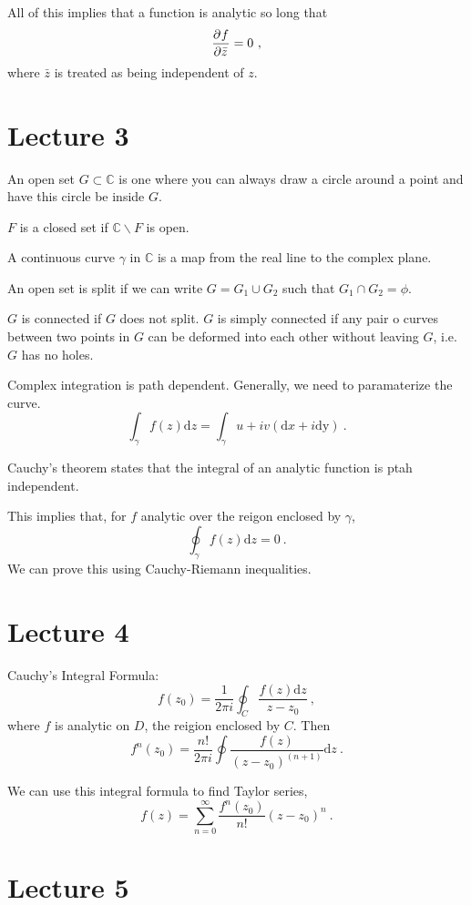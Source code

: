 \documentclass[11pt, a4paper]{article}
\begin{document}
All of this implies that a function is analytic so long that
$$
	\frac{\partial^{} {f}}{\partial {\bar{z}}^{}} = 0~,
$$
where $\bar{z}$ is treated as being independent of $z$.

\section{Lecture 3}

An open set $G\subset\mathbb{C}$ is one where you can always draw a circle around a point and have this circle be inside $G$.

$F$ is a closed set if $\mathbb{C}\backslash F$ is open.

A continuous curve $\gamma$ in $\mathbb{C}$ is a map from the real line to the complex plane.

An open set is split if we can write $G = G_1 \cup G_2$ such that $G_1 \cap G_2 = \phi$.

$G$ is connected if $G$ does not split.
$G$ is simply connected if any pair o curves between two points in $G$ can be deformed into each other without leaving $G$, i.e. $G$ has no holes.

Complex integration is path dependent. 
Generally, we need to paramaterize the curve.
$$
	\int_\gamma f(z)\mathrm{d}z = \int_\gamma u+iv(\mathrm{d}x + i\mathrm{dy})~.
$$

Cauchy's theorem states that the integral of an analytic function is ptah independent.

This implies that, for $f$ analytic over the reigon enclosed by $\gamma$,
$$
	\oint_\gamma f(z)\mathrm{d}z = 0~.
$$
We can prove this using Cauchy-Riemann inequalities.

\section{Lecture 4}

Cauchy's Integral Formula:
$$
	f(z_0) = \frac{1}{2\pi i} \oint_C \frac{f(z)\mathrm{d}z}{z-z_0}~,
$$
where $f$ is analytic on $D$, the reigion enclosed by $C$. Then
$$
f^n(z_0) = \frac{n!}{2\pi i} \oint \frac{f(z)}{(z-z_0)^(n+1)} \mathrm{d}z~.
$$

We can use this integral formula to find Taylor series,
$$
	f(z) = \sum_{n=0}^\infty \frac{f^n(z_0)}{n!}(z-z_0)^n~.
$$


\section{Lecture 5}
\end{document}
